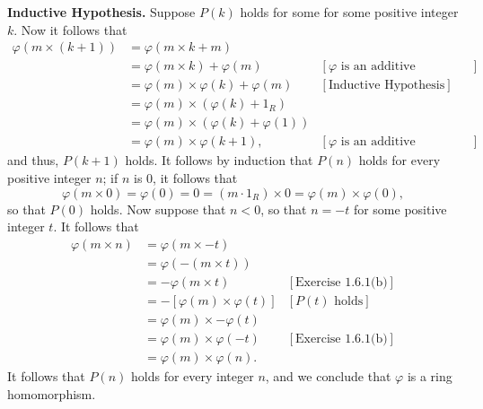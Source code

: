 \begin{enumerate}
\begin{enumerate}
\begin{itemize}
                        \textbf{Inductive Hypothesis.} Suppose $P(k)$ holds for 
                        some for some positive integer $k$. Now it follows that
                        \begin{align*}
                           \varphi(m \times (k+1)) &= \varphi(m \times k + m) \\
                              &= \varphi(m \times k) + \varphi(m)
                                 &[\varphi\text{ is an additive homomorphism}]\\
                              &= \varphi(m) \times \varphi(k) + \varphi(m)
                                 &[\text{Inductive Hypothesis}] \\
                              &= \varphi(m) \times (\varphi(k) + 1_R) \\
                              &= \varphi(m) \times (\varphi(k) + \varphi(1)) \\
                              &= \varphi(m) \times \varphi(k + 1),
                              &[\varphi \text{ is an additive homomorphism}] 
                        \end{align*}
                        and thus, $P(k + 1)$ holds. It follows by induction that 
                        $P(n)$ holds for every positive integer $n$; if $n$ is 
                        0, it follows that
                        $$\varphi(m \times 0) = \varphi(0) = 0 =
                          (m \cdot 1_R) \times 0 = \varphi(m)\times\varphi(0),$$
                        so that $P(0)$ holds. Now suppose that $n < 0$, so that 
                        $n = -t$ for some positive integer $t$. It follows that
                        \begin{align*}
                           \varphi(m \times n) &= \varphi(m \times -t) \\
                              &= \varphi(-(m \times t)) \\
                              &= -\varphi(m \times t)
                                 &[\text{Exercise 1.6.1(b)}] \\
                              &= -[\varphi(m)\times\varphi(t)]
                                 &[P(t) \text{ holds}] \\
                              &= \varphi(m) \times -\varphi(t) \\
                              &= \varphi(m) \times \varphi(-t)
                                 &[\text{Exercise 1.6.1(b)}] \\
                              &= \varphi(m) \times \varphi(n).
                        \end{align*}
                        It follows that $P(n)$ holds for every integer $n$, and 
                        we conclude that $\varphi$ is a ring homomorphism.
               \end{itemize}


\end{enumerate}
\end{enumerate}

